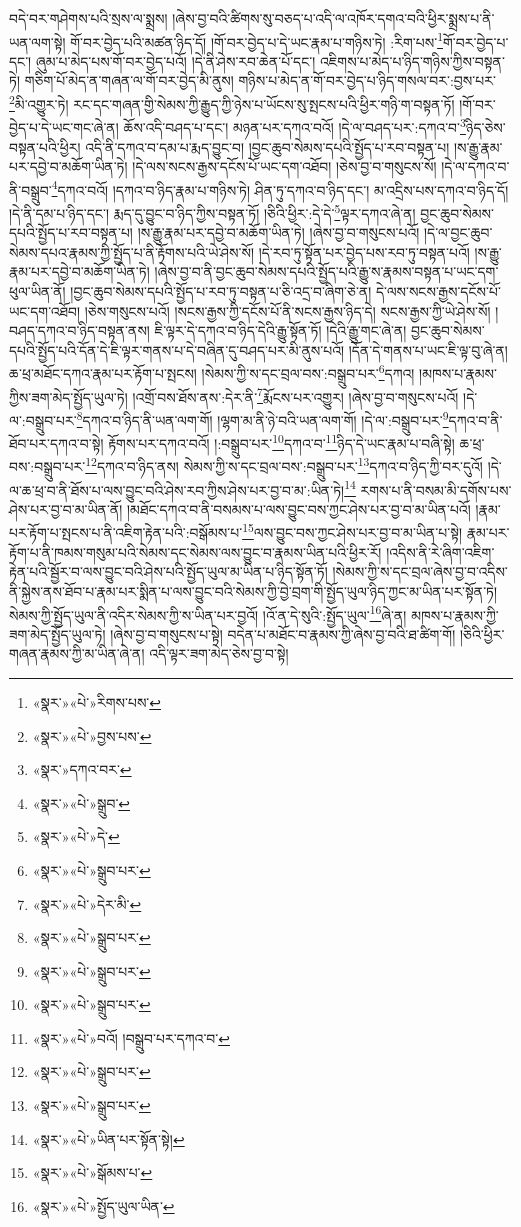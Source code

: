 བདེ་བར་གཤེགས་པའི་སྲས་ལ་སྨྲས། །ཞེས་བྱ་བའི་ཚིགས་སུ་བཅད་པ་འདི་ལ་འཁོར་དགའ་བའི་ཕྱིར་སྨྲས་པ་ནི་ཡན་ལག་སྟེ། གོ་བར་བྱེད་པའི་མཚན་ཉིད་དོ། །གོ་བར་བྱེད་པ་དེ་ཡང་རྣམ་པ་གཉིས་ཏེ། :རིག་པས་\footnote{«སྣར་»«པེ་»རིགས་པས་}གོ་བར་བྱེད་པ་དང་། ཞུམ་པ་མེད་པས་གོ་བར་བྱེད་པའོ། །དེ་ནི་ཤེས་རབ་ཆེན་པོ་དང་། འཇིགས་པ་མེད་པ་ཉིད་གཉིས་ཀྱིས་བསྟན་ཏེ། གཅིག་པོ་མེད་ན་གཞན་ལ་གོ་བར་བྱེད་མི་ནུས། གཉིས་པ་མེད་ན་གོ་བར་བྱེད་པ་ཉིད་གསལ་བར་:བྱས་པར་\footnote{«སྣར་»«པེ་»བྱས་པས་}མི་འགྱུར་ཏེ། རང་དང་གཞན་གྱི་སེམས་ཀྱི་རྒྱུད་ཀྱི་ཉེས་པ་ཡོངས་སུ་སྤངས་པའི་ཕྱིར་གཉི་ག་བསྟན་ཏོ། །གོ་བར་བྱེད་པ་དེ་ཡང་གང་ཞེ་ན། ཆོས་འདི་བཤད་པ་དང་། མཉན་པར་དཀའ་བའོ། །དེ་ལ་བཤད་པར་:དཀའ་བ་\footnote{«སྣར་»དཀའ་བར་}ཉིད་ཅེས་བསྟན་པའི་ཕྱིར། འདི་ནི་དཀའ་བ་དམ་པ་རྨད་བྱུང་བ། །བྱང་ཆུབ་སེམས་དཔའི་སྤྱོད་པ་རབ་བསྟན་པ། །ས་རྒྱུ་རྣམ་པར་དབྱེ་བ་མཆོག་ཡིན་ཏེ། །དེ་ལས་སངས་རྒྱས་དངོས་པོ་ཡང་དག་འཐོབ། །ཅེས་བྱ་བ་གསུངས་སོ། །དེ་ལ་དཀའ་བ་ནི་བསྒྲུབ་\footnote{«སྣར་»«པེ་»སྒྲུབ་}དཀའ་བའོ། །དཀའ་བ་ཉིད་རྣམ་པ་གཉིས་ཏེ། ཤིན་ཏུ་དཀའ་བ་ཉིད་དང་། མ་འདྲིས་པས་དཀའ་བ་ཉིད་དོ། །དེ་ནི་དམ་པ་ཉིད་དང་། རྨད་དུ་བྱུང་བ་ཉིད་ཀྱིས་བསྟན་ཏོ། །ཅིའི་ཕྱིར་:དེ་དེ་\footnote{«སྣར་»«པེ་»དེ་}ལྟར་དཀའ་ཞེ་ན། བྱང་ཆུབ་སེམས་དཔའི་སྤྱོད་པ་རབ་བསྟན་པ། །ས་རྒྱུ་རྣམ་པར་དབྱེ་བ་མཆོག་ཡིན་ཏེ། །ཞེས་བྱ་བ་གསུངས་པའོ། །དེ་ལ་བྱང་ཆུབ་སེམས་དཔའ་རྣམས་ཀྱི་སྤྱོད་པ་ནི་རྟོགས་པའི་ཡེ་ཤེས་སོ། །དེ་རབ་ཏུ་སྟོན་པར་བྱེད་པས་རབ་ཏུ་བསྟན་པའོ། །ས་རྒྱུ་རྣམ་པར་དབྱེ་བ་མཆོག་ཡིན་ཏེ། །ཞེས་བྱ་བ་ནི་བྱང་ཆུབ་སེམས་དཔའི་སྤྱོད་པའི་རྒྱུ་ས་རྣམས་བསྟན་པ་ཡང་དག་ཕུལ་ཡིན་ནོ། །བྱང་ཆུབ་སེམས་དཔའི་སྤྱོད་པ་རབ་ཏུ་བསྟན་པ་ཅི་འདྲ་བ་ཞིག་ཅེ་ན། དེ་ལས་སངས་རྒྱས་དངོས་པོ་ཡང་དག་འཐོབ། །ཅེས་གསུངས་པའོ། །སངས་རྒྱས་ཀྱི་དངོས་པོ་ནི་སངས་རྒྱས་ཉིད་དེ། སངས་རྒྱས་ཀྱི་ཡེ་ཤེས་སོ། །བཤད་དཀའ་བ་ཉིད་བསྟན་ནས། ཇི་ལྟར་དེ་དཀའ་བ་ཉིད་དེའི་རྒྱུ་སྟོན་ཏོ། །དེའི་རྒྱུ་གང་ཞེ་ན། བྱང་ཆུབ་སེམས་དཔའི་སྤྱོད་པའི་དོན་དེ་ཇི་ལྟར་གནས་པ་དེ་བཞིན་དུ་བཤད་པར་མི་ནུས་པའོ། །དོན་དེ་གནས་པ་ཡང་ཇི་ལྟ་བུ་ཞེ་ན། ཆ་ཕྲ་མཐོང་དཀའ་རྣམ་པར་རྟོག་པ་སྤངས། །སེམས་ཀྱི་ས་དང་བྲལ་བས་:བསྒྲུབ་པར་\footnote{«སྣར་»«པེ་»སྒྲུབ་པར་}དཀའ། །མཁས་པ་རྣམས་ཀྱིས་ཟག་མེད་སྤྱོད་ཡུལ་ཏེ། །འགྲོ་བས་ཐོས་ནས་:དེར་ནི་\footnote{«སྣར་»«པེ་»དེར་མི་}རྨོངས་པར་འགྱུར། །ཞེས་བྱ་བ་གསུངས་པའོ། །དེ་ལ་:བསྒྲུབ་པར་\footnote{«སྣར་»«པེ་»སྒྲུབ་པར་}དཀའ་བ་ཉིད་ནི་ཡན་ལག་གོ། །ལྷག་མ་ནི་ཉེ་བའི་ཡན་ལག་གོ། །དེ་ལ་:བསྒྲུབ་པར་\footnote{«སྣར་»«པེ་»སྒྲུབ་པར་}དཀའ་བ་ནི་ཐོབ་པར་དཀའ་བ་སྟེ། རྟོགས་པར་དཀའ་བའོ། །:བསྒྲུབ་པར་\footnote{«སྣར་»«པེ་»སྒྲུབ་པར་}དཀའ་བ་\footnote{«སྣར་»«པེ་»བའོ། །བསྒྲུབ་པར་དཀའ་བ་}ཉིད་དེ་ཡང་རྣམ་པ་བཞི་སྟེ། ཆ་ཕྲ་བས་:བསྒྲུབ་པར་\footnote{«སྣར་»«པེ་»སྒྲུབ་པར་}དཀའ་བ་ཉིད་ནས། སེམས་ཀྱི་ས་དང་བྲལ་བས་:བསྒྲུབ་པར་\footnote{«སྣར་»«པེ་»སྒྲུབ་པར་}དཀའ་བ་ཉིད་ཀྱི་བར་དུའོ། །དེ་ལ་ཆ་ཕྲ་བ་ནི་ཐོས་པ་ལས་བྱུང་བའི་ཤེས་རབ་ཀྱིས་ཤེས་པར་བྱ་བ་མ་:ཡིན་ཏེ།\footnote{«སྣར་»«པེ་»ཡིན་པར་སྟོན་སྟེ།} རགས་པ་ནི་བསམ་མི་དགོས་པས་ཤེས་པར་བྱ་བ་མ་ཡིན་ནོ། །མཐོང་དཀའ་བ་ནི་བསམས་པ་ལས་བྱུང་བས་ཀྱང་ཤེས་པར་བྱ་བ་མ་ཡིན་པའོ། །རྣམ་པར་རྟོག་པ་སྤངས་པ་ནི་འཇིག་རྟེན་པའི་:བསྒོམས་པ་\footnote{«སྣར་»«པེ་»སྒོམས་པ་}ལས་བྱུང་བས་ཀྱང་ཤེས་པར་བྱ་བ་མ་ཡིན་པ་སྟེ། རྣམ་པར་རྟོག་པ་ནི་ཁམས་གསུམ་པའི་སེམས་དང་སེམས་ལས་བྱུང་བ་རྣམས་ཡིན་པའི་ཕྱིར་རོ། །འདིས་ནི་རེ་ཞིག་འཇིག་རྟེན་པའི་སྦྱོར་བ་ལས་བྱུང་བའི་ཤེས་པའི་སྤྱོད་ཡུལ་མ་ཡིན་པ་ཉིད་སྟོན་ཏོ། །སེམས་ཀྱི་ས་དང་བྲལ་ཞེས་བྱ་བ་འདིས་ནི་སྐྱེས་ནས་ཐོབ་པ་རྣམ་པར་སྨིན་པ་ལས་བྱུང་བའི་སེམས་ཀྱི་བྱེ་བྲག་གི་སྤྱོད་ཡུལ་ཉིད་ཀྱང་མ་ཡིན་པར་སྟོན་ཏེ། སེམས་ཀྱི་སྤྱོད་ཡུལ་ནི་འདིར་སེམས་ཀྱི་ས་ཡིན་པར་བྱའོ། །འོ་ན་དེ་སུའི་:སྤྱོད་ཡུལ་\footnote{«སྣར་»«པེ་»སྤྱོད་ཡུལ་ཡིན་}ཞེ་ན། མཁས་པ་རྣམས་ཀྱི་ཟག་མེད་སྤྱོད་ཡུལ་ཏེ། །ཞེས་བྱ་བ་གསུངས་པ་སྟེ། བདེན་པ་མཐོང་བ་རྣམས་ཀྱི་ཞེས་བྱ་བའི་ཐ་ཚིག་གོ། །ཅིའི་ཕྱིར་གཞན་རྣམས་ཀྱི་མ་ཡིན་ཞེ་ན། འདི་ལྟར་ཟག་མེད་ཅེས་བྱ་བ་སྟེ། 